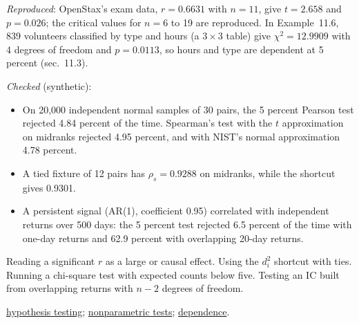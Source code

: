 \begin{qfmethod}
 \emph{Reproduced}: OpenStax's exam data, $r=0.6631$ with $n=11$, give $t=2.658$ and $p=0.026$; the critical values for $n=6$ to 19 are reproduced. In Example~11.6, 839 volunteers classified by type and hours (a $3\times3$ table) give $\chi^2=12.9909$ with 4 degrees of freedom and $p=0.0113$, so hours and type are dependent at 5 percent (sec.~11.3).

\emph{Checked} (synthetic):
\begin{itemize}
\item On 20{,}000 independent normal samples of 30 pairs, the 5 percent Pearson test rejected 4.84 percent of the time. Spearman's test with the $t$ approximation on midranks rejected 4.95 percent, and with NIST's normal approximation 4.78 percent.
\item A tied fixture of 12 pairs has $\rho_s=0.9288$ on midranks, while the shortcut gives 0.9301.
\item A persistent signal (AR(1), coefficient 0.95) correlated with independent returns over 500 days: the 5 percent test rejected 6.5 percent of the time with one-day returns and 62.9 percent with overlapping 20-day returns.
\end{itemize}

 Reading a significant $r$ as a large or causal effect. Using the $d_i^2$ shortcut with ties. Running a chi-square test with expected counts below five. Testing an IC built from overlapping returns with $n-2$ degrees of freedom.

 \hyperref[meth:hypothesis-testing]{hypothesis testing}; \hyperref[meth:nonparametric-tests]{nonparametric tests}; \hyperref[def:return-dependence]{dependence}.

\end{qfmethod}
